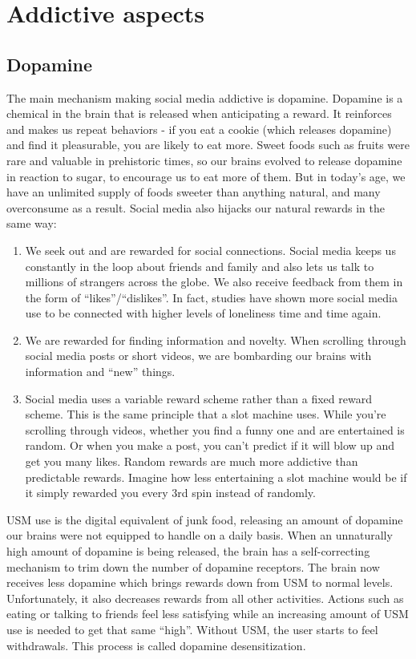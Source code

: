 \documentclass[
]{book}
\providecommand{\tightlist}{%
  \setlength{\itemsep}{0pt}\setlength{\parskip}{0pt}}
\begin{document}
\chapter{Addictive aspects}\label{why-addictive}

\section{Dopamine}\label{dopamine}

The main mechanism making social media addictive is dopamine. Dopamine is a chemical in the brain that is released when anticipating a reward. It reinforces and makes us repeat behaviors - if you eat a cookie (which releases dopamine) and find it pleasurable, you are likely to eat more. Sweet foods such as fruits were rare and valuable in prehistoric times, so our brains evolved to release dopamine in reaction to sugar, to encourage us to eat more of them. But in today's age, we have an unlimited supply of foods sweeter than anything natural, and many overconsume as a result. Social media also hijacks our natural rewards in the same way:

\begin{enumerate}
\def\labelenumi{\arabic{enumi}.}
\tightlist
\item
  We seek out and are rewarded for social connections. Social media keeps us constantly in the loop about friends and family and also lets us talk to millions of strangers across the globe. We also receive feedback from them in the form of ``likes''/``dislikes''. In fact, studies have shown more social media use to be connected with higher levels of loneliness time and time again.
\item
  We are rewarded for finding information and novelty. When scrolling through social media posts or short videos, we are bombarding our brains with information and ``new'' things.
\item
  Social media uses a variable reward scheme rather than a fixed reward scheme. This is the same principle that a slot machine uses. While you're scrolling through videos, whether you find a funny one and are entertained is random. Or when you make a post, you can't predict if it will blow up and get you many likes. Random rewards are much more addictive than predictable rewards. Imagine how less entertaining a slot machine would be if it simply rewarded you every 3rd spin instead of randomly.
\end{enumerate}

USM use is the digital equivalent of junk food, releasing an amount of dopamine our brains were not equipped to handle on a daily basis. When an unnaturally high amount of dopamine is being released, the brain has a self-correcting mechanism to trim down the number of dopamine receptors. The brain now receives less dopamine which brings rewards down from USM to normal levels. Unfortunately, it also decreases rewards from all other activities. Actions such as eating or talking to friends feel less satisfying while an increasing amount of USM use is needed to get that same ``high''. Without USM, the user starts to feel withdrawals. This process is called dopamine desensitization.
\end{document}
